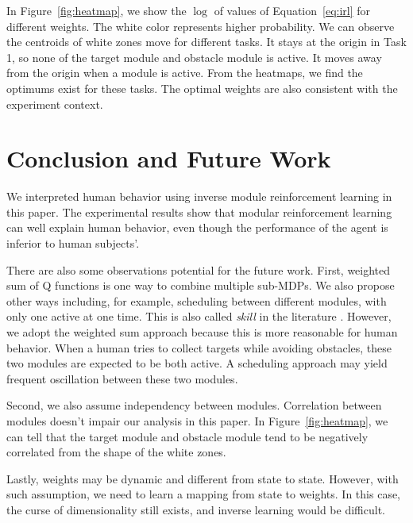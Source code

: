 \documentclass[11pt]{article} %
\begin{document}
In Figure~\ref{fig:heatmap}, we show the $\log$ of values of
Equation~\ref{eq:irl} for different weights. The white color represents higher
probability. We can observe the centroids of white zones move for different
tasks. It stays at the origin in Task 1, so none of the target module and
obstacle module is active. It moves away from the origin when a module is
active.  From the heatmaps, we find the optimums exist for these tasks. The
optimal weights are also consistent with the experiment context.

\section{Conclusion and Future Work}
\label{sec:conclude}

We interpreted human behavior using inverse module reinforcement learning in
this paper. The experimental results show that modular reinforcement learning
can well explain human behavior, even though the performance of the agent is
inferior to human subjects'.

There are also some observations potential for the future work. First, 
weighted sum of Q functions is one way to combine multiple sub-MDPs. We also
propose other ways including, for example, scheduling between different modules,
with only one active at one time. This is also called {\em skill} in the literature
\cite{konidaris2009skill}. However, we adopt the weighted sum approach
because this is more reasonable for human behavior. When a human tries to collect
targets while avoiding obstacles, these two modules are expected to be both
active. A scheduling approach may yield frequent oscillation between these two
modules.

Second, we also assume independency between modules. Correlation between
modules doesn't impair our analysis in this paper. In Figure~\ref{fig:heatmap},
we can tell that the target module and obstacle module tend to be negatively
correlated from the shape of the white zones.

Lastly, weights may be dynamic and different from state to state. However, with
such assumption, we need to learn a mapping from state to weights. In this case,
the curse of dimensionality still exists, and inverse learning would be
difficult.



\end{document}
